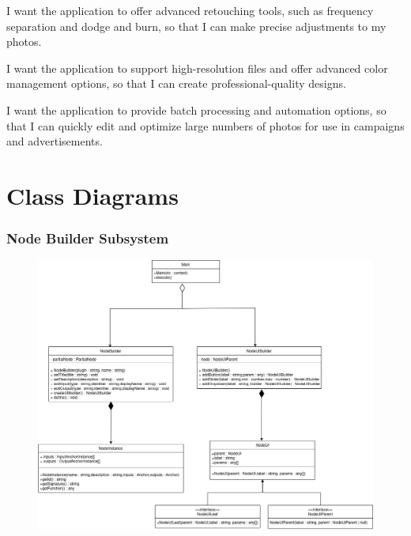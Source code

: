 \documentclass[11pt,a4paper]{article}
\begin{document}
I want the application to offer advanced retouching tools, such as frequency
separation and dodge and burn, so that I can make precise adjustments to my
photos.

I want the application to support high-resolution files and offer advanced color
management options, so that I can create professional-quality designs.

I want the application to provide batch processing and automation options, so
that I can quickly edit and optimize large numbers of photos for use in
campaigns and advertisements.

\pagebreak

\section*{Class Diagrams}

\subsubsection*{Node Builder Subsystem}
\begin{figure}[htbp]
    \centering
    \includegraphics[width=1.0\textwidth]{../diagramPng/Builder-subsystem.png}
\end{figure}

\clearpage

\end{document}
